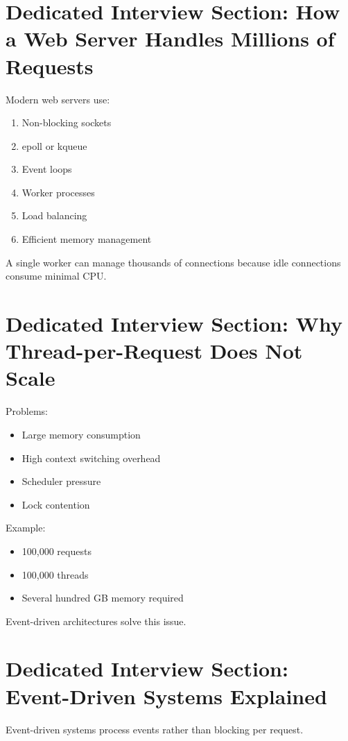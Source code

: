 \section{Dedicated Interview Section: How a Web Server Handles Millions of Requests}

Modern web servers use:

\begin{enumerate}
\item Non-blocking sockets
\item epoll or kqueue
\item Event loops
\item Worker processes
\item Load balancing
\item Efficient memory management
\end{enumerate}

A single worker can manage thousands of connections because idle connections consume minimal CPU.

\section{Dedicated Interview Section: Why Thread-per-Request Does Not Scale}

Problems:

\begin{itemize}
\item Large memory consumption
\item High context switching overhead
\item Scheduler pressure
\item Lock contention
\end{itemize}

Example:

\begin{itemize}
\item 100,000 requests
\item 100,000 threads
\item Several hundred GB memory required
\end{itemize}

Event-driven architectures solve this issue.

\section{Dedicated Interview Section: Event-Driven Systems Explained}

Event-driven systems process events rather than blocking per request.

